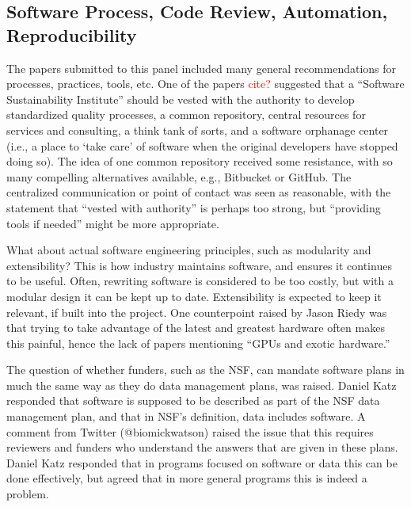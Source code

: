 \documentclass[11pt, oneside]{amsart}
\newcommand{\note}[1]{ {\textcolor{red}    { #1 }}}
\begin{document}
\subsection{Software Process, Code Review, Automation, Reproducibility}

The papers submitted to this panel included many general
recommendations for processes, practices, tools, etc. One of the
papers \note{cite?}  suggested that a ``Software Sustainability
Institute'' should be vested with the authority to develop
standardized quality processes, a common repository, central resources
for services and consulting, a think tank of sorts, and a software
orphanage center (i.e., a place to `take care' of software when the
original developers have stopped doing so).  The idea of one common
repository received some resistance, with so many compelling
alternatives available, e.g., Bitbucket or GitHub. The centralized
communication or point of contact was seen as reasonable, with the
statement that ``vested with authority'' is perhaps too strong, but
``providing tools if needed'' might be more appropriate.

What about actual software engineering principles, such as modularity
and extensibility? This is how industry maintains software, and
ensures it continues to be useful. Often, rewriting software is
considered to be too costly, but with a modular design it can be kept
up to date. Extensibility is expected to keep it relevant, if built
into the project. One counterpoint raised by Jason Riedy was that
trying to take advantage of the latest and greatest hardware often
makes this painful, hence the lack of papers mentioning ``GPUs and
exotic hardware.''

The question of whether funders, such as the NSF, can mandate software
plans in much the same way as they do data management plans, was
raised. Daniel Katz responded that software is supposed to be
described as part of the NSF data management plan, and that in NSF's
definition, data includes software. A comment from Twitter
(@biomickwatson) raised the issue that this requires reviewers and
funders who understand the answers that are given in these
plans. Daniel Katz responded that in programs focused on software or
data this can be done effectively, but agreed that in more general
programs this is indeed a problem.
\end{document}

